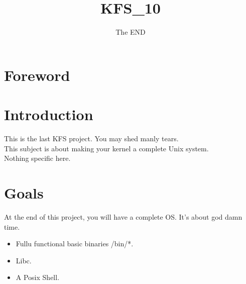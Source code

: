 \documentclass{42-en}
\begin{document}
                           \title{KFS\_10}
                          \subtitle{The END}


\maketitle

\tableofcontents


\chapter{Foreword}

\chapter{Introduction}
    This is the last KFS project. You may shed manly tears.\\
    This subject is about making your kernel a complete Unix system.\\
    Nothing specific here.\\

\chapter{Goals}
    At the end of this project, you will have a complete OS. It's about god
    damn time.
    \begin{itemize}\itemsep1pt
        \item Fullu functional basic binaries /bin/*.
        \item Libc.
        \item A Posix Shell.
    \end{itemize}
\end{document}
